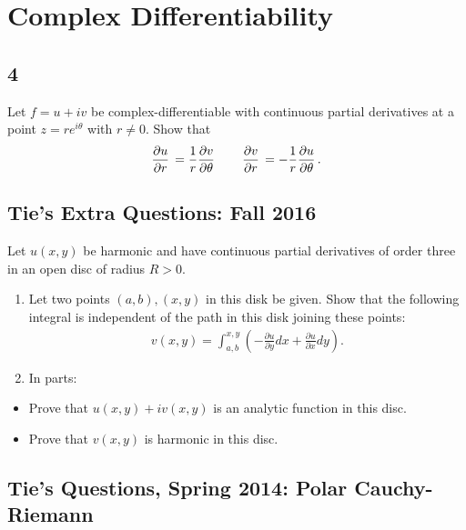 \hypertarget{complex-differentiability}{%
\section{Complex Differentiability}\label{complex-differentiability}}

\hypertarget{section-8}{%
\subsection{4}\label{section-8}}

Let \(f = u+iv\) be complex-differentiable with continuous partial
derivatives at a point \(z = re^{i\theta}\) with \(r\neq 0\). Show that
\begin{align*}  
{\frac{\partial u}{\partial r}\,} = {1\over r}{\frac{\partial v}{\partial \theta}\,} \qquad {\frac{\partial v}{\partial r}\,} = -{1\over r}{\frac{\partial u}{\partial \theta}\,}
.\end{align*}

\hypertarget{ties-extra-questions-fall-2016}{%
\subsection{Tie's Extra Questions: Fall
2016}\label{ties-extra-questions-fall-2016}}

Let \(u(x,y)\) be harmonic and have continuous partial derivatives of
order three in an open disc of radius \(R>0\).

\begin{enumerate}
\def\labelenumi{\alph{enumi}.}
\item
  Let two points \((a,b), (x,y)\) in this disk be given. Show that the
  following integral is independent of the path in this disk joining
  these points:
  \begin{align*}
  v(x,y) = \int_{a,b}^{x,y} ( -\frac{\partial u}{\partial y}dx +  \frac{\partial u}{\partial x}dy)
  .\end{align*}
\item
  In parts:
\end{enumerate}

\begin{itemize}
\tightlist
\item
  Prove that \(u(x,y)+i v(x,y)\) is an analytic function in this disc.
\item
  Prove that \(v(x,y)\) is harmonic in this disc.
\end{itemize}

\hypertarget{ties-questions-spring-2014-polar-cauchy-riemann}{%
\subsection{Tie's Questions, Spring 2014: Polar
Cauchy-Riemann}\label{ties-questions-spring-2014-polar-cauchy-riemann}}

